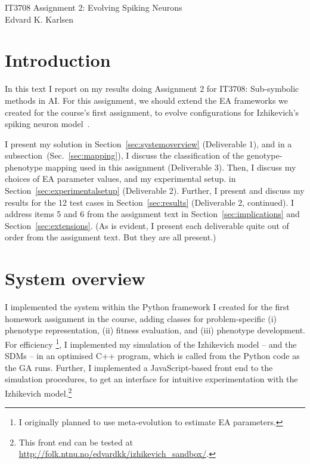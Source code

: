 \documentclass[a4paper,9pt]{article}
\newcommand{\tightit}{\vspace{-5pt}}
\begin{document}
{
\centering
\Large{IT3708 Assignment 2: Evolving Spiking Neurons}  \\
\vspace{3pt}
\small{Edvard K. Karlsen} \\
}

\vspace{-2pt}

\section{Introduction}
\tightit
In this text I report on my results doing Assignment 2 for IT3708: Sub-symbolic
methods in AI. For this assignment, we should extend the EA frameworks we created
for the course's first assignment, to evolve configurations for Izhikevich's
spiking neuron model~\cite{izhikevich}.

I present my solution in Section~\ref{sec:systemoverview} (Deliverable 1), and
in a subsection~(Sec.~\ref{sec:mapping}), I discuss the classification of the
genotype-phenotype mapping used in this assignment (Deliverable 3).  Then, I
discuss my choices of EA parameter values, and my experimental setup.  in
Section~\ref{sec:experimentalsetup} (Deliverable 2). Further, I present and
discuss my results for the 12 test cases in Section~\ref{sec:results}
(Deliverable 2, continued). I address items 5 and 6 from the assignment text
in Section~\ref{sec:implications} and Section~\ref{sec:extensions}. (As is
evident, I present each deliverable quite out of order from the assignment
text. But they are all present.)

\section{System overview}
\tightit \label{sec:systemoverview}

I implemented the system within the Python framework I created for the first
homework assignment in the course, adding classes for problem-specific (i)
phenotype representation, (ii) fitness evaluation, and (iii) phenotype
development. For efficiency \footnote{I originally planned to use
meta-evolution to estimate EA parameters.}, I implemented my simulation of the
Izhikevich model -- and the SDMs -- in an optimised C++ program, which is
called from the Python code as the GA runs.
Further, I implemented a JavaScript-based front end to the simulation
procedures, to get an interface for intuitive experimentation with the
Izhikevich model.\footnote{This front end can be tested at
\url{http://folk.ntnu.no/edvardkk/izhikevich_sandbox/}.}
\end{document}
